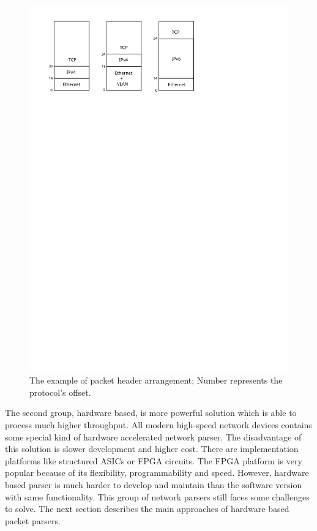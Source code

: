 \begin{figure}[t]
    \centering
    \includegraphics[scale=0.78]{chapters/pic/HeaderParsingExample}
    \caption{The example of packet header arrangement; Number represents the protocol's offset.}
    \label{fig:PacketHeaderArrangement}
\end{figure}

The second group, hardware based, is more powerful solution which is able to process much higher throughput. 
All modern high-speed network devices contains some special kind of hardware accelerated network parser. 
The disadvantage of this solution is slower development and higher cost.
There are implementation platforms like structured ASICs or FPGA circuits. 
The FPGA platform is very popular because of its flexibility, programmability and speed. 
However, hardware based parser is much harder to develop and maintain than the software version with same functionality. 
This group of network parsers still faces some challenges to solve. 
The next section describes the main approaches of hardware based packet parsers.

